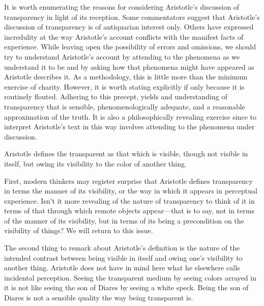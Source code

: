 \documentclass[12pt]{article}
\begin{document}
It is worth enumerating the reasons for considering Aristotle's discussion of transparency in light of its reception. Some commentators suggest that Aristotle's discussion of transparency is of antiquarian interest only. Others have expressed incredulity at the way Aristotle's account conflicts with the manifest facts of experience. While leaving open the possibility of errors and omissions, we should try to understand Aristotle's account by attending to the phenomena as we understand it to be and by asking how that phenomena might have appeared as Aristotle describes it. As a methodology, this is little more than the minimum exercise of charity. However, it is worth stating explicitly if only because it is routinely flouted. Adhering to this precept, yields and understanding of transparency that is sensible, phenomenologically adequate, and a reasonable approximation of the truth. It is also a philosophically revealing exercise since to interpret Aristotle's text in this way involves attending to the phenomena under discussion.

Aristotle defines the transparent as that which is visible, though not visible in itself, but owing its visibility to the color of another thing. 

First, modern thinkers may register surprise that Aristotle defines transparency in terms the manner of its visibility, or the way in which it appears in perceptual experience. Isn't it more revealing of the nature of transparency to think of it in terms of that through which remote objects appear---that is to say, not in terms of the manner of its visibility, but in terms of its being a precondition on the visibility of things? We will return to this issue.

The second thing to remark about Aristotle's definition is the nature of the intended contrast between being visible in itself and owing one's visibility to another thing. Aristotle does not have in mind here what he elsewhere calls incidental perception. Seeing the transparent medium by seeing colors arrayed in it is not like seeing the son of Diares by seeing a white speck. Being the son of Diares is not a sensible quality the way being transparent is.
\end{document}
